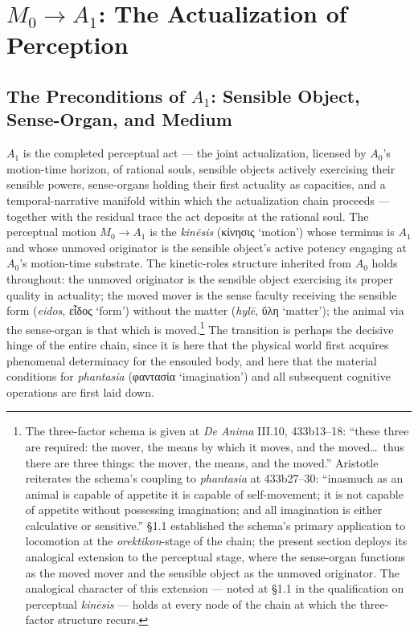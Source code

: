 \documentclass{article}
\newcommand{\gk}[1]{{\greekfont #1}}
\begin{document}
\section{$M_0 \rightarrow A_1$: The Actualization of Perception}

\subsection{The Preconditions of $A_1$: Sensible Object, Sense-Organ, and Medium}

$A_1$ is the completed perceptual act --- the joint actualization, licensed by $A_0$'s motion-time horizon, of rational souls, sensible objects actively exercising their sensible powers, sense-organs holding their first actuality as capacities, and a temporal-narrative manifold within which the actualization chain proceeds --- together with the residual trace the act deposits at the rational soul. The perceptual motion $M_0 \rightarrow A_1$ is the \textit{kinēsis} (\gk{κίνησις} `motion') whose terminus is $A_1$ and whose unmoved originator is the sensible object's active potency engaging at $A_0$'s motion-time substrate. The kinetic-roles structure inherited from $A_0$ holds throughout: the unmoved originator is the sensible object exercising its proper quality in actuality; the moved mover is the sense faculty receiving the sensible form (\textit{eidos}, \gk{εἶδος} `form') without the matter (\textit{hylē}, \gk{ὕλη} `matter'); the animal via the sense-organ is that which is moved.\footnote{The three-factor schema is given at \textit{De Anima} III.10, 433b13--18: ``these three are required: the mover, the means by which it moves, and the moved\ldots\ thus there are three things: the mover, the means, and the moved.'' Aristotle reiterates the schema's coupling to \textit{phantasia} at 433b27--30: ``inasmuch as an animal is capable of appetite it is capable of self-movement; it is not capable of appetite without possessing imagination; and all imagination is either calculative or sensitive.'' §1.1 established the schema's primary application to locomotion at the \textit{orektikon}-stage of the chain; the present section deploys its analogical extension to the perceptual stage, where the sense-organ functions as the moved mover and the sensible object as the unmoved originator. The analogical character of this extension --- noted at \S 1.1 in the qualification on perceptual \textit{kinēsis} --- holds at every node of the chain at which the three-factor structure recurs.} The transition is perhaps the decisive hinge of the entire chain, since it is here that the physical world first acquires phenomenal determinacy for the ensouled body, and here that the material conditions for \textit{phantasia} (\gk{φαντασία} `imagination') and all subsequent cognitive operations are first laid down.
\end{document}

